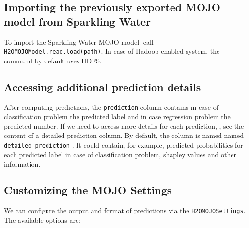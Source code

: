 \subsection{Importing the previously exported MOJO model from Sparkling Water}

To import the Sparkling Water MOJO model, call\\ \texttt{H2OMOJOModel.read.load(path)}. In case of Hadoop enabled system, the command by default
uses HDFS.

\subsection{Accessing additional prediction details}

After computing predictions, the \texttt{prediction} column contains in case of classification problem the predicted label
and in case regression problem the predicted number. If we need to access more details for each prediction, , see the content
of a detailed prediction column. By default, the column is named named \texttt{detailed\_prediction} . It could contain, for example,
predicted probabilities for each predicted label in case of classification problem, shapley values and other information.

\subsection{Customizing the MOJO Settings}

We can configure the output and format of predictions via the \texttt{H2OMOJOSettings}. The available options are:

